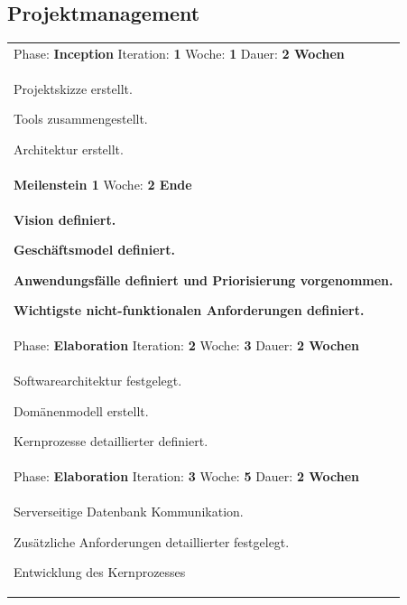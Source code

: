 \documentclass[11pt,ngerman]{article}
\begin{document}
    \subsection{Projektmanagement}
\begin{tabularx}{\textwidth}{X}
	\toprule
	Phase: \textbf{Inception} Iteration: \textbf{1} Woche: \textbf{1} Dauer: \textbf{2 Wochen}\\
	\begin{compactitem}
		\item Projektskizze erstellt.
		\item Tools zusammengestellt.
		\item Architektur erstellt.
	\end{compactitem}\\
	\toprule
	\rowcolor{lightgray}
	\textbf{Meilenstein 1} Woche: \textbf{2 Ende}\\
	\rowcolor{lightgray}
	\begin{compactitem}
		\item \textbf{Vision definiert.}
		\item \textbf{Geschäftsmodel definiert.}
		\item \textbf{Anwendungsfälle definiert und Priorisierung vorgenommen.}
		\item \textbf{Wichtigste nicht-funktionalen Anforderungen definiert.}
	\end{compactitem}\\
	\toprule
	Phase: \textbf{Elaboration} Iteration: \textbf{2} Woche: \textbf{3} Dauer: \textbf{2 Wochen}\\
	\begin{compactitem}
		\item Softwarearchitektur festgelegt.
		\item Domänenmodell erstellt.
		\item Kernprozesse detaillierter definiert.
	\end{compactitem}\\
	\toprule
	Phase: \textbf{Elaboration} Iteration: \textbf{3} Woche: \textbf{5} Dauer: \textbf{2 Wochen}\\
	\begin{compactitem}
		\item Serverseitige Datenbank Kommunikation.
		\item Zusätzliche Anforderungen detaillierter festgelegt.
		\item Entwicklung des Kernprozesses


\end{compactitem}
\end{tabularx}
\end{document}

